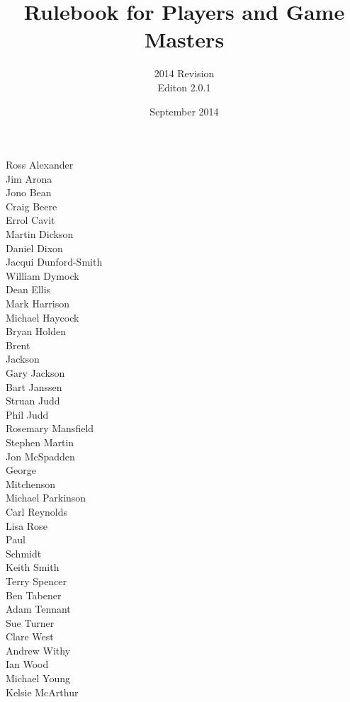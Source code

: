\documentclass[a4paper,10pt]{report}
\begin{document}
\title{Rulebook for Players and Game Masters\\ \coverpic}
\author{2014 Revision\\Editon 2.0.1}
\date{September 2014}

\maketitle

\begin{Contributors}
Ross Alexander \\
Jim Arona \\
Jono Bean \\
Craig Beere \\
Errol Cavit \\
Martin Dickson \\
Daniel Dixon \\
Jacqui Dunford-Smith \\
William Dymock \\
Dean Ellis \\
Mark Harrison \\
Michael Haycock \\
Bryan Holden \\
Brent \\
Jackson \\
Gary Jackson \\
Bart Janssen \\
Struan Judd \\
Phil Judd \\
Rosemary Mansfield \\
Stephen Martin \\
Jon McSpadden \\
George \\
Mitchenson \\
Michael Parkinson \\
Carl Reynolds \\
Lisa Rose \\
Paul \\
Schmidt \\
Keith Smith \\
Terry Spencer \\
Ben Tabener \\
Adam Tennant \\
Sue Turner \\
Clare West \\
Andrew Withy \\
Ian Wood \\
Michael Young \\
Kelsie McArthur \\
\end{Contributors}
\end{document}
